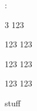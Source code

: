 \documentclass{article}
\begin{document}
\ExplSyntaxOn
\prettyinit:
\ExplSyntaxOff

	\begin{saveenv} 3
		123
	\end{saveenv}

\prettyV\data

\ExplSyntaxOn
{}

\ExplSyntaxOff

	\begin{custom}
		123	
		123 
	\end{custom}

	\prettyV\data

	\begin{custom *^}
		123  
		123		
	\end{custom *^}

	\begin{custom *^}
		123  
		123		
	\end{custom *^}

\prettyV\data

stuff
\end{document}
